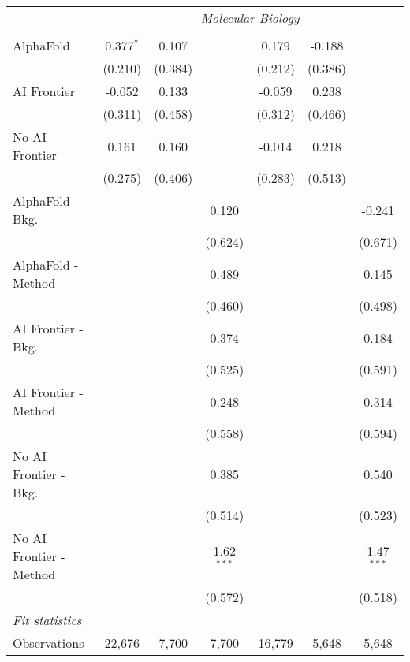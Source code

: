 \begin{tabular}{lcccccc}
 & \multicolumn{6}{c}{\textit{Molecular Biology}} \\ \\
   AlphaFold               & 0.377$^{*}$ & 0.107   &              & 0.179   & -0.188  &   \\   
                           & (0.210)     & (0.384) &              & (0.212) & (0.386) &   \\   
   AI Frontier             & -0.052      & 0.133   &              & -0.059  & 0.238   &   \\   
                           & (0.311)     & (0.458) &              & (0.312) & (0.466) &   \\   
   No AI Frontier          & 0.161       & 0.160   &              & -0.014  & 0.218   &   \\   
                           & (0.275)     & (0.406) &              & (0.283) & (0.513) &   \\   
   AlphaFold - Bkg.        &             &         & 0.120        &         &         & -0.241\\   
                           &             &         & (0.624)      &         &         & (0.671)\\   
   AlphaFold - Method      &             &         & 0.489        &         &         & 0.145\\   
                           &             &         & (0.460)      &         &         & (0.498)\\   
   AI Frontier - Bkg.      &             &         & 0.374        &         &         & 0.184\\   
                           &             &         & (0.525)      &         &         & (0.591)\\   
   AI Frontier - Method    &             &         & 0.248        &         &         & 0.314\\   
                           &             &         & (0.558)      &         &         & (0.594)\\   
   No AI Frontier - Bkg.   &             &         & 0.385        &         &         & 0.540\\   
                           &             &         & (0.514)      &         &         & (0.523)\\   
   No AI Frontier - Method &             &         & 1.62$^{***}$ &         &         & 1.47$^{***}$\\   
                           &             &         & (0.572)      &         &         & (0.518)\\   
   \midrule
   \emph{Fit statistics}\\
   Observations            & 22,676      & 7,700   & 7,700        & 16,779  & 5,648   & 5,648\\  
   

\end{tabular}
